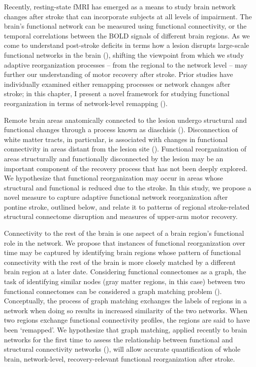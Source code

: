 \documentclass[phd,tocprelim]{cornell}
\begin{document}
Recently, resting-state fMRI has emerged as a means to study brain network changes after stroke that can incorporate subjects at all levels of impairment. The brain's functional network can be measured using functional connectivity,  or the temporal correlations between the BOLD signals of different brain regions.  As we come to understand post-stroke deficits in terms how a lesion disrupts large-scale functional networks in the brain (\cite{Carrera2014-ah, Griffis2019-cy}), shifting the viewpoint from which we study adaptive reorganization processes -- from the regional to the network level -- may further our understanding of motor recovery after stroke.  Prior studies have individually examined either remapping processes or network changes after stroke; in this chapter, I present a novel framework for studying functional reorganization in terms of network-level remapping (\cite{Olafson2021-qt}). 

    Remote brain areas anatomically connected to the lesion undergo structural and functional changes through a process known as diaschisis (\cite{Carrera2014-ah}).  Disconnection of white matter tracts, in particular, is associated with changes in functional connectivity in areas distant from the lesion site (\cite{Lu2011-ow,Griffis2020-hx,Griffis2019-cy}).  Functional reorganization of areas structurally and functionally disconnected by the lesion may be an important component of the recovery process that has not been deeply explored. We hypothesize that functional reorganization may occur in areas whose structural and functional is reduced due to the stroke. In this study, we propose a novel measure to capture adaptive functional network reorganization after pontine stroke, outlined below, and relate it to patterns of regional stroke-related structural connectome disruption and measures of upper-arm motor recovery. 

	Connectivity to the rest of the brain is one aspect of a brain region's functional role in the network. We propose that instances of functional reorganization over time may be captured by identifying brain regions whose pattern of functional connectivity with the rest of the brain is more closely matched by a different brain region at a later date. Considering functional connectomes as a graph, the task of identifying similar nodes (gray matter regions, in this case) between two functional connectomes can be considered a graph matching problem (\cite{Conte2004-ro}). Conceptually, the process of graph matching exchanges the labels of regions in a network when doing so results in increased similarity of the two networks. When two regions exchange functional connectivity profiles, the regions are said to have been ‘remapped’. We hypothesize that graph matching, applied recently to brain networks for the first time to assess the relationship between functional and structural connectivity networks (\cite{Osmanlioglu2019-ao}), will allow accurate quantification of whole brain, network-level, recovery-relevant functional reorganization after stroke. 	
	
\end{document}
